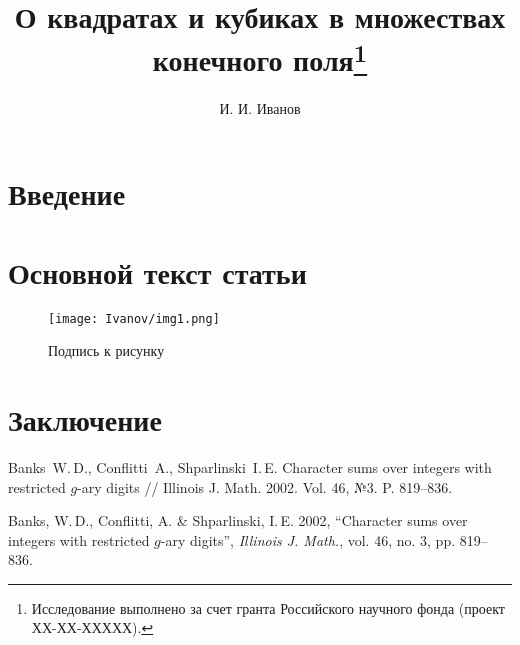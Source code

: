\documentclass[11pt,twoside,draft
]{article}
\title
{%
О квадратах и кубиках в множествах конечного поля\footnote{Исследование выполнено за счет гранта Российского научного фонда (проект ХХ-ХХ-ХХХХХ).}}
{%
On the squares and cubes in the set of finite fields}
\author
{%
И. И. Иванов}
{%
I. I. Ivanov}
\begin{document}
\maketitle

\enmaketitle

\section{Введение}

\section{Основной текст статьи}


\begin{figure}[ht!]
  \centering
  \texttt{[image: Ivanov/img1.png]} %
  \caption{Подпись к рисунку}
  \label{formula 1} %
\end{figure}

\section{Заключение}

\begin{thebibliography}{99}
	
	Banks~W.\,D., Conflitti~A., Shparlinski~I.\,E. Character sums over integers with restricted $g$-ary digits // Illinois J. Math. 2002. Vol. 46, №3. P. 819--836.
		

\end{thebibliography}


\begin{engbibliography}{99}
	
	Banks, W.\,D., Conflitti, A. \& Shparlinski, I.\,E. 2002, ``Character sums over integers with restricted $g$-ary digits'', \textit{Illinois J. Math.}, vol. 46, no. 3, pp. 819--836.

\end{engbibliography}

\label{end}
\end{document}

